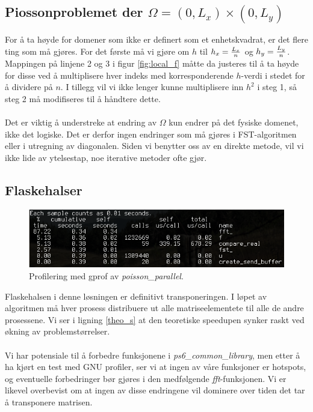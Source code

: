 \documentclass{article}
\begin{document}
\subsection{Piossonproblemet der $\Omega = (0, L_x) \times (0, L_y)$}
For å ta høyde for domener som ikke er definert som et enhetskvadrat, er det flere ting som må gjøres. For det første må vi gjøre om $h$ til $h_x = {L_x \over n}$ og $h_y = {L_y \over n}$. Mappingen på linjene 2 og 3 i figur \ref{fig:local_f} måtte da justeres til å ta høyde for disse ved å multiplisere hver indeks med korresponderende $h$-verdi i stedet for å dividere på $n$. I tillegg vil vi ikke lenger kunne multiplisere inn $h^2$ i steg 1, så steg 2 må modifiseres til å håndtere dette.\\
\\
Det er viktig å understreke at endring av $\Omega$ kun endrer på det fysiske domenet, ikke det logiske. Det er derfor ingen endringer som må gjøres i FST-algoritmen eller i utregning av diagonalen. Siden vi benytter oss av en direkte metode, vil vi ikke lide av ytelsestap, noe iterative metoder ofte gjør.

\subsection{Flaskehalser}
\begin{figure}[t]
	\centering
	\includegraphics[width=12cm]{img/gprof.png}
	\caption{Profilering med gprof av \emph{poisson\_parallel}.}		
	\label{fig:gprof}
\end{figure}
Flaskehalsen i denne løsningen er definitivt transponeringen. I løpet av algoritmen må hver prosess distribuere ut alle matriseelementete til alle de andre prosessene. Vi ser i ligning \ref{theo_s} at den teoretiske speedupen synker raskt ved økning av problemstørrelser.\\
\\
Vi har potensiale til å forbedre funksjonene i \emph{ps6\_common\_library}, men etter å ha kjørt en test med GNU profiler, ser vi at ingen av våre funksjoner er hotspots, og eventuelle forbedringer bør gjøres i den medfølgende \emph{fft}-funksjonen. Vi er likevel overbevist om at ingen av disse endringene vil dominere over tiden det tar å transponere matrisen.
\newpage

\end{document}
